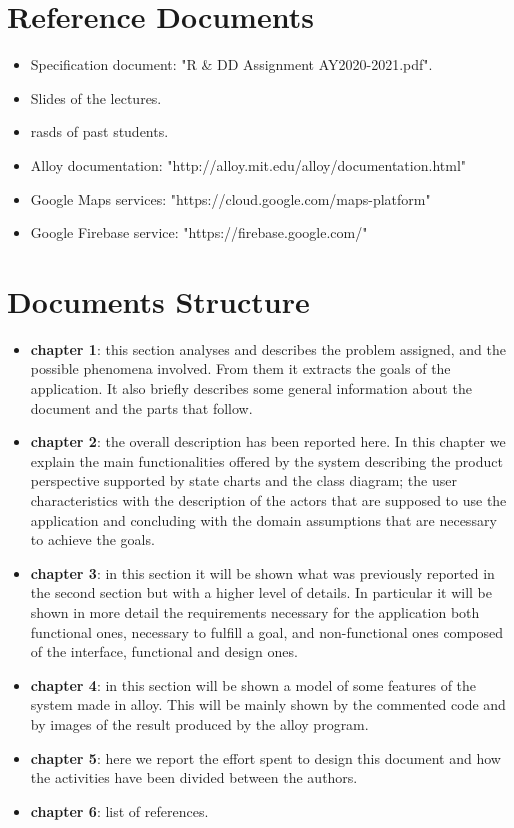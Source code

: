 \section{Reference Documents}

\begin{itemize}
    \item Specification document: "R \& DD Assignment AY2020-2021.pdf".
    \item Slides of the lectures.
    \item \glspl{rasd} of past students.
    \item Alloy documentation: "http://alloy.mit.edu/alloy/documentation.html"
    \item Google Maps services: "https://cloud.google.com/maps-platform"
    \item Google Firebase service: "https://firebase.google.com/"
\end{itemize}



\section{Documents Structure}

\begin{itemize}
    \item \textbf{chapter 1}: this section analyses and describes the problem assigned, and the possible phenomena involved. From them it extracts the goals of the application. It also briefly describes some general information about the document and the parts that follow.
    \item \textbf{chapter 2}: the overall description has been reported here. In this chapter we explain the main functionalities offered by the system describing the product perspective supported by state charts and the class diagram; the user characteristics with the description of the actors that are supposed to use the application and concluding with the domain assumptions that are necessary to achieve the goals.
    \item \textbf{chapter 3}: in this section it will be shown what was previously reported in the second section but with a higher level of details. In particular it will be shown in more detail the requirements necessary for the application both functional ones, necessary to fulfill a goal, and non-functional ones composed of the interface, functional and design ones.
    \item \textbf{chapter 4}: in this section will be shown a model of some features of the system made in alloy. This will be mainly shown by the commented code and by images of the result produced by the alloy program.
    \item \textbf{chapter 5}: here we report the effort spent to design this document and how the activities have been divided between the authors.
    \item \textbf{chapter 6}: list of references.
\end{itemize}